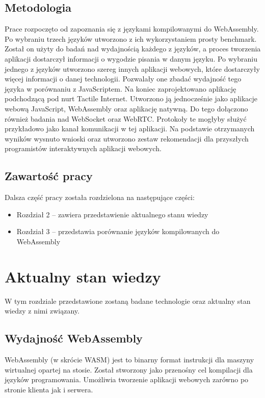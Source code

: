 \documentclass[language=polish,type=master]{aghmodern}
\begin{document}
\section{Metodologia}
Prace rozpoczęto od zapoznania się z językami kompilowanymi do WebAssembly.
Po wybraniu trzech języków utworzono z ich wykorzystaniem prosty benchmark.
Został on użyty do badań nad wydajnością każdego z języków, a proces tworzenia aplikacji dostarczył informacji o wygodzie pisania w danym języku.
Po wybraniu jednego z języków utworzono szereg innych aplikacji webowych, które dostarczyły więcej informacji o danej technologii.
Pozwalały one zbadać wydajność tego języka w porównaniu z JavaScriptem.
Na koniec zaprojektowano aplikację podchodzącą pod nurt Tactile Internet.
Utworzono ją jednocześnie jako aplikacje webową JavaScript, WebAssembly oraz aplikację natywną.
Do tego dołączono również badania nad WebSocket oraz WebRTC.
Protokoły te mogłyby służyć przykładowo jako kanał komunikacji w tej aplikacji.
Na podstawie otrzymanych wyników wysnuto wnioski oraz utworzono zestaw rekomendacji dla przyszłych programistów interaktywnych aplikacji webowych.


\section{Zawartość pracy}
Dalsza część pracy została rozdzielona na następujące części:

\begin{itemize}
    \item Rozdział 2 -- zawiera przedstawienie aktualnego stanu wiedzy
    \item Rozdział 3 -- przedstawia porównanie języków kompilowanych do WebAssembly
\end{itemize}

\chapter{Aktualny stan wiedzy}
W tym rozdziale przedstawione zostaną badane technologie oraz aktualny stan wiedzy z nimi związany.

\section{Wydajność WebAssembly}
WebAssembly (w skrócie WASM) jest to binarny format instrukcji dla maszyny wirtualnej opartej na stosie.
Został stworzony jako przenośny cel kompilacji dla języków programowania.
Umożliwia tworzenie aplikacji webowych zarówno po stronie klienta jak i serwera.
\end{document}
